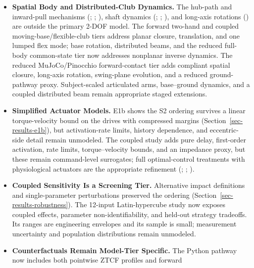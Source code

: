 \documentclass[
  letterpaper,
]{report}
\providecommand{\tightlist}{%
  \setlength{\itemsep}{0pt}\setlength{\parskip}{0pt}}
\begin{document}
\begin{itemize}
\tightlist
\item
  \textbf{Spatial Body and Distributed-Club Dynamics.} The hub-path and
  inward-pull mechanisms (;
  ;
  ), shaft
  dynamics (;
  ;
  ), and long-axis
  rotations () are
  outside the primary 2-DOF model. The forward two-hand and coupled
  moving-base/flexible-club tiers address planar closure, translation,
  and one lumped flex mode; base rotation, distributed beams, and the
  reduced full-body common-state tier now addresses nonplanar inverse
  dynamics. The reduced MuJoCo/Pinocchio forward-contact tier adds
  compliant spatial closure, long-axis rotation, swing-plane evolution,
  and a reduced ground-pathway proxy. Subject-scaled articulated arms,
  base--ground dynamics, and a coupled distributed beam remain
  appropriate staged extensions.
\item
  \textbf{Simplified Actuator Models.} E1b shows the S2 ordering
  survives a linear torque-velocity bound on the drives with compressed
  margins (Section~\ref{sec-results-e1b}), but activation-rate limits,
  history dependence, and eccentric-side detail remain unmodeled. The
  coupled study adds pure delay, first-order activation, rate limits,
  torque--velocity bounds, and an impedance proxy, but these remain
  command-level surrogates; full optimal-control treatments with
  physiological actuators are the appropriate refinement
  (;
  ;
  ).
\item
  \textbf{Coupled Sensitivity Is a Screening Tier.} Alternative impact
  definitions and single-parameter perturbations preserved the ordering
  (Section~\ref{sec-results-robustness}). The 12-input Latin-hypercube
  study now exposes coupled effects, parameter non-identifiability, and
  held-out strategy tradeoffs. Its ranges are engineering envelopes and
  its sample is small; measurement uncertainty and population
  distributions remain unmodeled.
\item
  \textbf{Counterfactuals Remain Model-Tier Specific.} The Python
  pathway now includes both pointwise ZTCF profiles and forward

\end{itemize}
\end{document}
